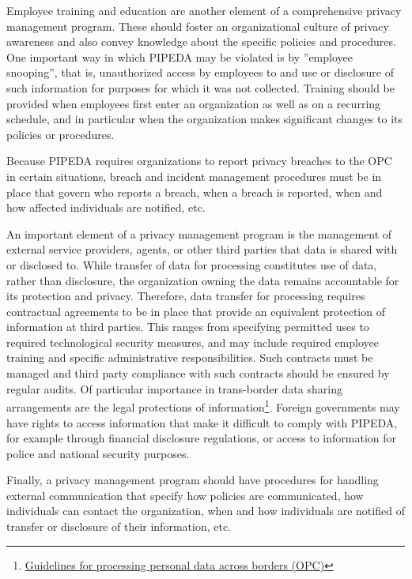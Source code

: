 Employee training and education are another element of a comprehensive privacy management program. These should foster an organizational culture of privacy awareness and also convey knowledge about the specific policies and procedures. One important way in which PIPEDA may be violated is by ''employee snooping'', that is, unauthorized access by employees to and use or disclosure of such information for purposes for which it was not collected. Training should be provided when employees first enter an organization as well as on a recurring schedule, and in particular when the organization makes significant changes to its policies or procedures. 

Because PIPEDA requires organizations to report privacy breaches to the OPC in certain situations, breach and incident management procedures must be in place that govern who reports a breach, when a breach is reported, when and how affected individuals are notified, etc. 

An important element of a privacy management program is the management of external service providers, agents, or other third parties that data is shared with or disclosed to. While transfer of data for processing constitutes use of data, rather than disclosure, the organization owning the data remains accountable for its protection and privacy. Therefore, data transfer for processing requires contractual agreements to be in place that provide an equivalent protection of information at third parties. This ranges from specifying permitted uses to required technological security measures, and may include required employee training and specific administrative responsibilities. Such contracts must be managed and third party compliance with such contracts should be ensured by regular audits. Of particular importance in trans-border data sharing arrangements are the legal protections of information\footnote{\href{https://www.priv.gc.ca/en/privacy-topics/airports-and-borders/gl_dab_090127/}{Guidelines for processing personal data across borders (OPC)}}. Foreign governments may have rights to access information that make it difficult to comply with PIPEDA, for example through financial disclosure regulations, or access to information for police and national security purposes.

Finally, a privacy management program should have procedures for handling external communication that specify how policies are communicated, how individuals can contact the organization, when and how individuals are notified of transfer or disclosure of their information, etc.

